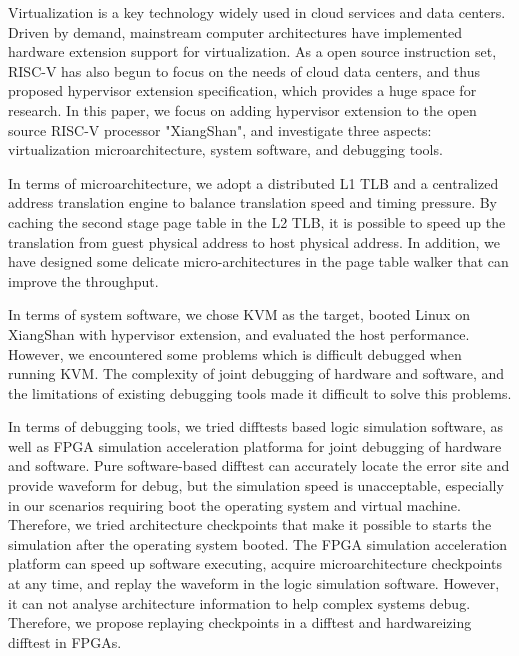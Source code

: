 \begin{eabstract}
Virtualization is a key technology widely used in cloud services and data centers.
Driven by demand, mainstream computer architectures have implemented hardware extension support for virtualization.
As a open source instruction set, RISC-V has also begun to focus on the needs of cloud data centers, 
and thus proposed hypervisor extension specification, which provides a huge space for research.
In this paper, we focus on adding hypervisor extension to the open source RISC-V processor "XiangShan", 
and investigate three aspects: virtualization microarchitecture, system software, and debugging tools.

In terms of microarchitecture, 
we adopt a distributed L1 TLB and a centralized address translation engine to balance translation speed and timing pressure.
By caching the second stage page table in the L2 TLB, it is possible to speed up the translation from guest physical address to host physical address.
In addition, we have designed some delicate micro-architectures in the page table walker that can improve the throughput.

In terms of system software, we chose KVM as the target, 
booted Linux on XiangShan with hypervisor extension, and evaluated the host performance.
However, we encountered some problems which is difficult debugged when running KVM. 
The complexity of joint debugging of hardware and software,
and the limitations of existing debugging tools made it difficult to solve this problems.
  
In terms of debugging tools, we tried difftests based logic simulation software, 
as well as FPGA simulation acceleration platforma for joint debugging of hardware and software.
Pure software-based difftest can accurately locate the error site and provide waveform for debug, 
but the simulation speed is unacceptable, especially in our scenarios requiring boot the operating system and virtual machine.
Therefore, we tried architecture checkpoints that make it possible to starts the simulation after the operating system booted.
The FPGA simulation acceleration platform can speed up software executing, acquire microarchitecture checkpoints at any time, 
and replay the waveform in the logic simulation software.
However, it can not analyse architecture information to help complex systems debug.
Therefore, we propose replaying checkpoints in a difftest and hardwareizing difftest in FPGAs.
\end{eabstract}
